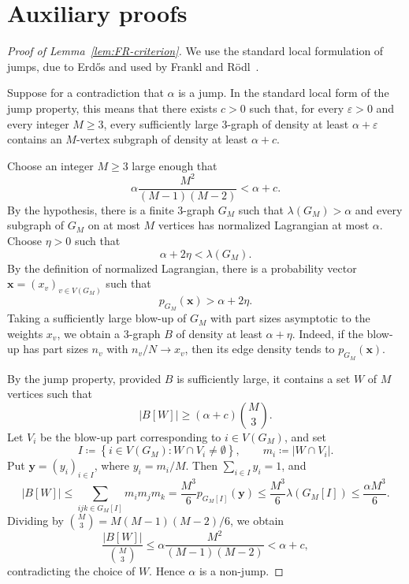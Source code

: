 \documentclass[10pt]{article}
\numberwithin{equation}{section}
\theoremstyle{definition}
\theoremstyle{remark}
\newcommand{\La}{\lambda}
\begin{document}


\appendix
\section*{Auxiliary proofs}

\begin{proof}[Proof of Lemma~\ref{lem:FR-criterion}]
We use the standard local formulation of jumps, due to Erd\H{o}s and used by Frankl and R\"odl~\cite{FranklRodl84}.

Suppose for a contradiction that $\alpha$ is a jump. In the standard local form of the jump property, this means that there exists $c>0$ such that, for every $\varepsilon>0$ and every integer $M\ge3$, every sufficiently large $3$-graph of density at least $\alpha+\varepsilon$ contains an $M$-vertex subgraph of density at least $\alpha+c$.

Choose an integer $M\ge3$ large enough that
\[
        \alpha\frac{M^2}{(M-1)(M-2)}<\alpha+c.
\]
By the hypothesis, there is a finite $3$-graph $G_M$ such that $\La(G_M)>\alpha$ and every subgraph of $G_M$ on at most $M$ vertices has normalized Lagrangian at most $\alpha$. Choose $\eta>0$ such that
\[
        \alpha+2\eta<\La(G_M).
\]
By the definition of normalized Lagrangian, there is a probability vector $\mathbf{x}=(x_v)_{v\in V(G_M)}$ such that
\[
        p_{G_M}(\mathbf{x})>\alpha+2\eta.
\]
Taking a sufficiently large blow-up of $G_M$ with part sizes asymptotic to the weights $x_v$, we obtain a $3$-graph $B$ of density at least $\alpha+\eta$. Indeed, if the blow-up has part sizes $n_v$ with $n_v/N\to x_v$, then its edge density tends to $p_{G_M}(\mathbf{x})$.

By the jump property, provided $B$ is sufficiently large, it contains a set $W$ of $M$ vertices such that
\[
        |B[W]| \ge (\alpha+c)\binom M3.
\]
Let $V_i$ be the blow-up part corresponding to $i\in V(G_M)$, and set
\[
        I \coloneqq \left\{i\in V(G_M) \colon W\cap V_i\ne\emptyset \right\},
        \qquad
        m_i \coloneqq |W\cap V_i|.
\]
Put $\mathbf{y}=(y_i)_{i\in I}$, where $y_i=m_i/M$. Then $\sum_{i\in I}y_i=1$, and
\[
        |B[W]|
        \le
        \sum_{ijk\in G_M[I]}m_i m_j m_k
        =
        \frac{M^3}{6}p_{G_M[I]}(\mathbf{y})
        \le
        \frac{M^3}{6}\La(G_M[I])
        \le
        \frac{\alpha M^3}{6}.
\]
Dividing by $\binom M3=M(M-1)(M-2)/6$, we obtain
\[
        \frac{|B[W]|}{\binom M3}
        \le
        \alpha\frac{M^2}{(M-1)(M-2)}
        <\alpha+c,
\]
contradicting the choice of $W$. Hence $\alpha$ is a non-jump.
\end{proof}
\end{document}
